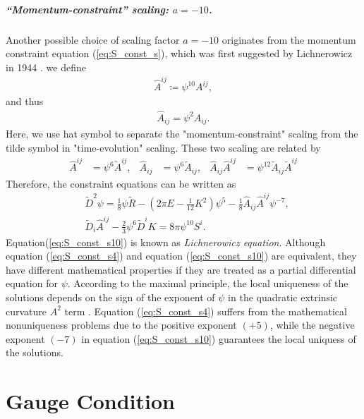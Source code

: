 \subparagraph{“Momentum-constraint” scaling: $a=-10$.}
Another possible choice of scaling factor $a=-10$ originates from the momentum constraint equation (\ref{eq:S_const_s}),
which was first suggested by Lichnerowicz in 1944 \cite{lichnerowicz1944integration}.
we define
\begin{align}
    \hat{A}^{ij} \coloneqq \psi^{10} A^{ij},
\end{align}
and thus
\begin{align}
    \hat{A}_{ij} = \psi^{2} A_{ij}.
\end{align}
Here, we use hat symbol to separate the "momentum-constraint" scaling from the tilde symbol in "time-evolution" scaling.
These two scaling are related by
\begin{align}
    \hat{A}^{ij}&= \psi^6\tilde{A}^{ij}, &\hat{A}_{ij} &= \psi^6 \tilde{A}_{ij}, &\hat{A}_{ij} \hat{A}^{ij} &= \psi^{12} \tilde{A}_{ij} \tilde{A}^{ij}
\end{align}
Therefore, the constraint equations can be written as
\begin{align}
    &\tilde{D}^2 \psi = \frac{1}{8} \psi \tilde{R} - \left( 2\pi E - \frac{1}{12}K^2 \right) \psi^5 - \frac{1}{8} \hat{A}_{ij} \hat{A}^{ij} \psi^{-7}, 
    \label{eq:H_const_s10}\\
    &\tilde{D}_i \hat{A}^{ij} - \frac{2}{3}\psi^6 \tilde{D}^i K = 8\pi \psi^{10} S^i.\label{eq:S_const_s10}
\end{align}
Equation(\ref{eq:S_const_s10}) is known as \textit{Lichnerowicz equation}.
Although equation (\ref{eq:S_const_s4}) and equation (\ref{eq:S_const_s10}) are equivalent,
they have different mathematical properties if they are treated as a partial differential equation for $\psi$.
According to the maximal principle,
the local uniqueness of the solutions depends on the sign of the exponent of $\psi$ in the quadratic extrinsic curvature $A^2$ term 
\cite{cordero2009improved,smarr1979sources,taylor1991partial,evans1997partial,protter2012maximum}.
Equation (\ref{eq:S_const_s4}) suffers from the mathematical nonuniqueness problems due to the positive exponent $(+5)$,
while the negative exponent $(-7)$ in equation (\ref{eq:S_const_s10}) guarantees the local uniquess of the solutions.

\section{Gauge Condition}  %
\label{section2.4}

